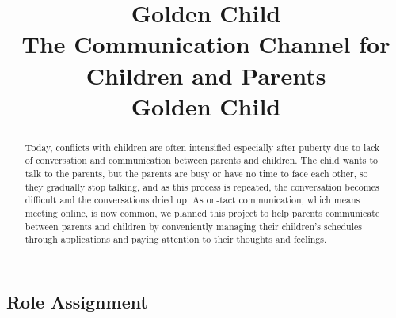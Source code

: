 \documentclass[conference]{IEEEtran}
\begin{document}
\title{Golden Child \\
  {\LARGE The Communication Channel for Children and Parents} \\
  {\footnotesize \large Golden Child}
   }

\author{
\and
{}
\and
{}
\and
{}
}

\maketitle

\begin{abstract}
  Today, conflicts with children are often intensified especially after puberty due to lack of conversation and communication between parents and children. The child wants to talk to the parents, but the parents are busy or have no time to face each other, so they gradually stop talking, and as this process is repeated, the conversation becomes difficult and the conversations dried up. As on-tact communication, which means meeting online, is now common, we planned this project to help parents communicate between parents and children by conveniently managing their children's schedules through applications and paying attention to their thoughts and feelings.
\end{abstract}
\hspace{10cm} 
\subsection{\large{Role Assignment}}
\end{document}
